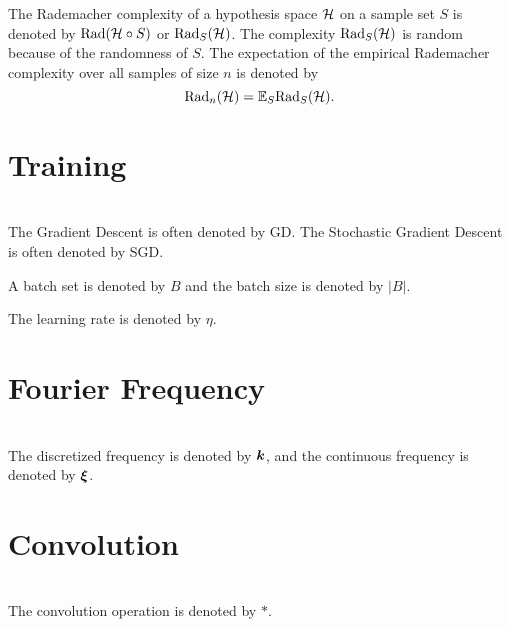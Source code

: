 \documentclass{article}
\begin{document}
The Rademacher complexity of a hypothesis space $\mathcal{H}$ on a sample set $S$ is denoted by ${\rm Rad} (\mathcal{H}\circ S)$ or ${\rm Rad}_{S} (\mathcal{H})$. The complexity ${\rm Rad}_{S} (\mathcal{H})$ is random because of the randomness of $S$. The expectation of the empirical Rademacher complexity over all samples of size $n$ is denoted by
\[
    {\rm Rad}_{n} (\mathcal{H})=\mathbb{E}_{S} {\rm Rad}_{S} (\mathcal{H}).
\]

\section{Training}~\\
The Gradient Descent is often denoted by GD. The Stochastic Gradient Descent is often denoted by SGD.

A batch set is denoted by $B$ and the batch size is denoted by $|B|$.

The learning rate is denoted by $\eta$.


\section{Fourier Frequency}~\\
The discretized frequency is denoted by $\bm{k}$, and the continuous frequency is denoted by $\bm{\xi}$.

\section{Convolution}~\\
The convolution operation is denoted by $*$.

\newpage
\end{document}
